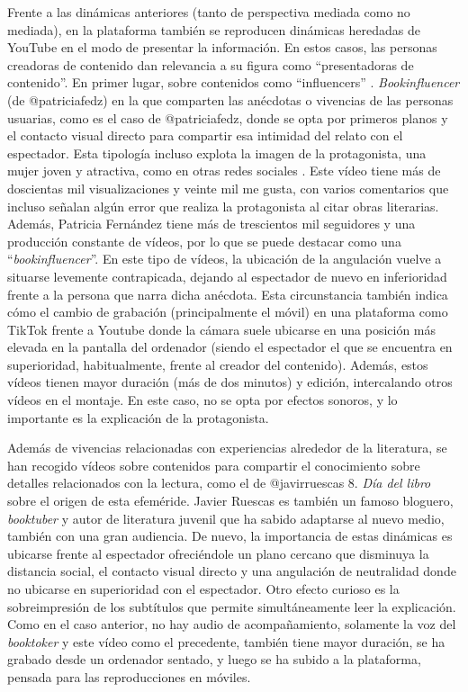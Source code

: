 Frente a las dinámicas anteriores (tanto de perspectiva mediada como no
mediada), en la plataforma también se reproducen dinámicas heredadas de
YouTube en el modo de presentar la información. En estos casos, las
personas creadoras de contenido dan relevancia a su figura como
``presentadoras de contenido''. En primer lugar, sobre contenidos como
``influencers'' \cite{establés2019}.
\emph{Bookinfluencer} (de @patriciafedz) en la que comparten las
anécdotas o vivencias de las personas usuarias, como es el caso de
@patriciafedz, donde se opta por primeros planos y el contacto visual
directo para compartir esa intimidad del relato con el espectador. Esta
tipología incluso explota la imagen de la protagonista, una mujer joven
y atractiva, como en otras redes sociales \cite{calvo2018,dezuanni2022}. Este vídeo tiene más de doscientas
mil visualizaciones y veinte mil me gusta, con varios comentarios que
incluso señalan algún error que realiza la protagonista al citar obras
literarias. Además, Patricia Fernández tiene más de trescientos mil
seguidores y una producción constante de vídeos, por lo que se puede
destacar como una ``\emph{bookinfluencer}''. En este tipo de vídeos, la
ubicación de la angulación vuelve a situarse levemente contrapicada,
dejando al espectador de nuevo en inferioridad frente a la persona que
narra dicha anécdota. Esta circunstancia también indica cómo el cambio
de grabación (principalmente el móvil) en una plataforma como TikTok
frente a Youtube donde la cámara suele ubicarse en una posición más
elevada en la pantalla del ordenador (siendo el espectador el que se
encuentra en superioridad, habitualmente, frente al creador del
contenido). Además, estos vídeos tienen mayor duración (más de dos
minutos) y edición, intercalando otros vídeos en el montaje. En este
caso, no se opta por efectos sonoros, y lo importante es la explicación
de la protagonista.

Además de vivencias relacionadas con experiencias alrededor de la
literatura, se han recogido vídeos sobre contenidos para compartir el
conocimiento sobre detalles relacionados con la lectura, como el de
@javirruescas 8. \emph{Día del libro} sobre el origen de esta efeméride.
Javier Ruescas es también un famoso bloguero, \emph{booktuber} y autor
de literatura juvenil \cite{ruescas2012} que ha sabido adaptarse al nuevo
medio, también con una gran audiencia. De nuevo, la importancia de estas
dinámicas es ubicarse frente al espectador ofreciéndole un plano cercano
que disminuya la distancia social, el contacto visual directo y una
angulación de neutralidad donde no ubicarse en superioridad con el
espectador. Otro efecto curioso es la sobreimpresión de los subtítulos
que permite simultáneamente leer la explicación. Como en el caso
anterior, no hay audio de acompañamiento, solamente la voz del
\emph{booktoker} y este vídeo como el precedente, también tiene mayor
duración, se ha grabado desde un ordenador sentado, y luego se ha subido
a la plataforma, pensada para las reproducciones en móviles.

